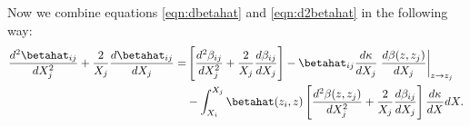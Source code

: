 Now we combine equations \ref{eqn:dbetahat} and \ref{eqn:d2betahat} in the following way:
\begin{eqnarray}
\label{eqn:betahatcombine}
\frac{d^2 \betahat_{i j}}{d X_j^2} + \frac{2}{X_j} \frac{d \betahat_{i j}}{d X_j} = & \left[\frac{d^2 \beta_{i j}}{d X_j^2}  + \frac{2}{X_j} \frac{d \beta_{i j}}{d X_j}\right] -  \betahat_{i j} \frac{d \kappa}{d X_j} \left. \frac{d \beta(z, z_j)}{d X_j}  \right|_{z \rightarrow z_j} \nonumber \\ 
 &- \int_{X_i}^{X_j} \betahat(z_i, z)\left[ \frac{d^2 \beta(z, z_j)}{d X_j^2}  + \frac{2}{X_j} \frac{d \beta_{i j}}{dX_j}\right] \frac{d \kappa}{d X} d X.
\end{eqnarray}
  
  
  
  
  
  
  
  
  
  
  
  
  